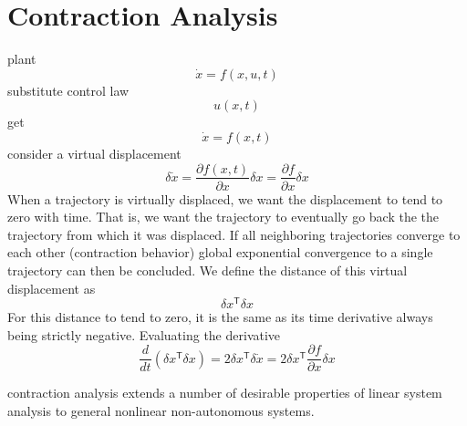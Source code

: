 \section{Contraction Analysis}
plant
\begin{equation*}
  \dot{x}=f(x,u,t)
\end{equation*}
substitute control law
\begin{equation*}
  u(x,t)
\end{equation*}
get
\begin{equation*}
  \dot{x}=f(x,t)
\end{equation*}
consider a virtual displacement
\begin{equation*}
  \delta\dot{x}=\frac{\partial{}f(x,t)}{\partial{}x}\delta x=\frac{\partial{}f}{\partial{}x}\delta x
\end{equation*}
When a trajectory is virtually displaced, we want the displacement to tend to zero with time.
That is, we want the trajectory to eventually go back the the trajectory from which it was displaced.
If all neighboring trajectories converge to each other (contraction behavior) global exponential convergence to a single trajectory can then be concluded.
We define the distance of this virtual displacement as
\begin{equation*}
  \delta x^{\mathsf{T}}\delta x
\end{equation*}
For this distance to tend to zero, it is the same as its time derivative always being strictly negative.
Evaluating the derivative
\begin{equation*}
  \frac{d}{dt}(\delta x^{\mathsf{T}}\delta x)=2\delta x^{\mathsf{T}}\delta\dot{x}=2\delta x^{\mathsf{T}}\frac{\partial{}f}{\partial{}x}\delta x
\end{equation*}

contraction analysis extends a number of desirable properties of linear system analysis to general nonlinear non-autonomous systems.
